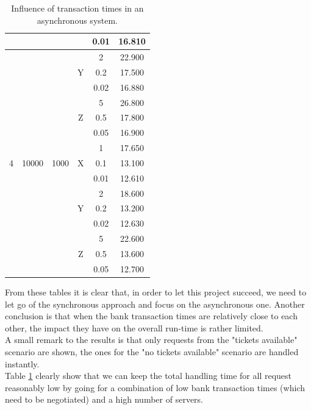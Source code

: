 \documentclass[10pt,a4paper,twocolumn]{article}
\begin{document}
\begin{table}[!t]
{\begin{tabular}{c|c|c|c|c|c}
									 &									& 								  &						& 0.01 					   & 16.810 \\\hline
									 &									& 								  &				        & 2 						 & 22.900 \\
									 &	 								& 								  & Y				   & 0.2 					   & 17.500\\
									 &									& 								  &						& 0.02 					   & 16.880 \\\hline
									 &									& 								  &				   		& 5 						 & 26.800 \\
									 &	 								& 								  & Z				   & 0.5 					   & 17.800\\
									 &									& 								  &						& 0.05 					   & 16.900\\\hline
	 								 &  					  			&  								  & 					& 1 						 & 17.650 \\
	4								&	10000 					  & 1000						& X					 & 0.1 						 & 13.100 \\
									 &									& 								  &						& 0.01 					   & 12.610 \\\hline
									 &									& 								  &				   		& 2 						 & 18.600 \\
									 &	 								& 								  & Y				   & 0.2 					   & 13.200\\
									 &									& 								  &						& 0.02 					   & 12.630 \\\hline
									 &									& 								  &				   		& 5 						 & 22.600 \\
									 &	 								& 								  & Z				   & 0.5 					   & 13.600\\
									 &									& 								  &						& 0.05 					   & 12.700\\
	\end{tabular}}
	\caption{\label{tab:banking-time-influence-asynchronous}Influence of transaction times in an asynchronous system.}
\end{table}\noindent
From these tables it is clear that, in order to let this project succeed, we need to let go of the synchronous approach and focus on the asynchronous one. Another conclusion is that when the bank transaction times are relatively close to each other, the impact they have on the overall run-time is rather limited.\\
A small remark to the results is that only requests from the "tickets available" scenario are shown, the ones for the "no tickets available" scenario are handled instantly.\\
Table \ref{tab:banking-time-influence-asynchronous} clearly show that we can keep the total handling time for all request reasonably low by going for a combination of low bank transaction times (which need to be negotiated) and a high number of servers.
\end{document}
